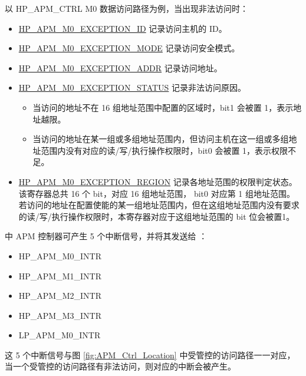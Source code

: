 \documentclass[main\_\_CN.tex]{subfiles}
\begin{document}
以 HP\_APM\_CTRL M0 数据访问路径为例，当出现非法访问时：
\begin{itemize}
    \item \hyperref[fielddesc:HPAPMM0EXCEPTIONID]{HP\_APM\_M0\_EXCEPTION\_ID} 记录访问主机的 ID。
    \item \hyperref[fielddesc:HPAPMM0EXCEPTIONMODE]{HP\_APM\_M0\_EXCEPTION\_MODE} 记录访问安全模式。
    \item \hyperref[fielddesc:HPAPMM0EXCEPTIONADDR]{HP\_APM\_M0\_EXCEPTION\_ADDR} 记录访问地址。
    \item \hyperref[fielddesc:HPAPMM0EXCEPTIONSTATUS]{HP\_APM\_M0\_EXCEPTION\_STATUS} 记录非法访问原因。
    \begin{itemize}
        \item  当访问的地址不在 16 组地址范围中配置的区域时，bit1 会被置 1，表示地址越限。
        \item  当访问的地址在某一组或多组地址范围内，但访问主机在这一组或多组地址范围内没有对应的读/写/执行操作权限时，bit0 会被置 1，表示权限不足。
    \end{itemize}
    \item \hyperref[fielddesc:HPAPMM0EXCEPTIONREGION]{HP\_APM\_M0\_EXCEPTION\_REGION} 记录各地址范围的权限判定状态。该寄存器总共 16 个 bit，对应 16 组地址范围， bit0 对应第 1 组地址范围。若访问的地址在配置使能的某一组地址范围内，但在这组地址范围内没有要求的读/写/执行操作权限时，本寄存器对应于这组地址范围的 bit 位会被置1。


\end{itemize}

\chipname{} 中 APM 控制器可产生 5 个中断信号，并将其发送给 \textit{}：

    \begin{itemize}
    \item HP\_APM\_M0\_INTR
    \item HP\_APM\_M1\_INTR
    \item HP\_APM\_M2\_INTR
    \item HP\_APM\_M3\_INTR
    \item LP\_APM\_M0\_INTR
    \end{itemize}

这 5 个中断信号与图 \ref{fig:APM_Ctrl_Location} 中受管控的访问路径一一对应，当一个受管控的访问路径有非法访问，则对应的中断会被产生。


\end{document}
